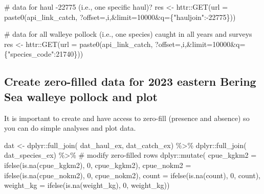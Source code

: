\documentclass[
  letterpaper,
  oneside,
  open=any]{scrbook}
\newenvironment{Shaded}{\begin{snugshade}}{\end{snugshade}}
\newcommand{\AttributeTok}[1]{\textcolor[rgb]{0.40,0.45,0.13}{#1}}
\newcommand{\CommentTok}[1]{\textcolor[rgb]{0.37,0.37,0.37}{#1}}
\newcommand{\DecValTok}[1]{\textcolor[rgb]{0.68,0.00,0.00}{#1}}
\newcommand{\FunctionTok}[1]{\textcolor[rgb]{0.28,0.35,0.67}{#1}}
\newcommand{\NormalTok}[1]{\textcolor[rgb]{0.00,0.23,0.31}{#1}}
\newcommand{\OtherTok}[1]{\textcolor[rgb]{0.00,0.23,0.31}{#1}}
\newcommand{\SpecialCharTok}[1]{\textcolor[rgb]{0.37,0.37,0.37}{#1}}
\newcommand{\StringTok}[1]{\textcolor[rgb]{0.13,0.47,0.30}{#1}}
\begin{document}
\begin{Shaded}
\begin{Highlighting}[]
\CommentTok{\# data for haul {-}22775 (i.e., one specific haul)?}
\NormalTok{res }\OtherTok{\textless{}{-}}\NormalTok{ httr}\SpecialCharTok{::}\FunctionTok{GET}\NormalTok{(}\AttributeTok{url =} \FunctionTok{paste0}\NormalTok{(api\_link\_catch, }
                              \StringTok{\textquotesingle{}?offset=\textquotesingle{}}\NormalTok{,i,}\StringTok{\textquotesingle{}\&limit=10000\&q=\{"hauljoin":{-}22775\}\textquotesingle{}}\NormalTok{))}

\CommentTok{\# data for all walleye pollock (i.e., one species) caught in all years and surveys}
\NormalTok{res }\OtherTok{\textless{}{-}}\NormalTok{ httr}\SpecialCharTok{::}\FunctionTok{GET}\NormalTok{(}\AttributeTok{url =} \FunctionTok{paste0}\NormalTok{(api\_link\_catch, }
                              \StringTok{\textquotesingle{}?offset=\textquotesingle{}}\NormalTok{,i,}\StringTok{\textquotesingle{}\&limit=10000\&q=\{"species\_code":21740\}\textquotesingle{}}\NormalTok{))}
\end{Highlighting}
\end{Shaded}

\subsection{Create zero-filled data for 2023 eastern Bering Sea walleye
pollock and
plot}\label{create-zero-filled-data-for-2023-eastern-bering-sea-walleye-pollock-and-plot}

It is important to create and have access to zero-fill (presence and
absence) so you can do simple analyses and plot data.

\begin{Shaded}
\begin{Highlighting}[]
\NormalTok{dat }\OtherTok{\textless{}{-}}\NormalTok{ dplyr}\SpecialCharTok{::}\FunctionTok{full\_join}\NormalTok{(}
\NormalTok{  dat\_haul\_ex,}
\NormalTok{  dat\_catch\_ex) }\SpecialCharTok{\%\textgreater{}\%} 
\NormalTok{  dplyr}\SpecialCharTok{::}\FunctionTok{full\_join}\NormalTok{(}
\NormalTok{    dat\_species\_ex)  }\SpecialCharTok{\%\textgreater{}\%} 
  \CommentTok{\# modify zero{-}filled rows}
\NormalTok{  dplyr}\SpecialCharTok{::}\FunctionTok{mutate}\NormalTok{(}
    \AttributeTok{cpue\_kgkm2 =} \FunctionTok{ifelse}\NormalTok{(}\FunctionTok{is.na}\NormalTok{(cpue\_kgkm2), }\DecValTok{0}\NormalTok{, cpue\_kgkm2),}
    \AttributeTok{cpue\_nokm2 =} \FunctionTok{ifelse}\NormalTok{(}\FunctionTok{is.na}\NormalTok{(cpue\_nokm2), }\DecValTok{0}\NormalTok{, cpue\_nokm2),}
    \AttributeTok{count =} \FunctionTok{ifelse}\NormalTok{(}\FunctionTok{is.na}\NormalTok{(count), }\DecValTok{0}\NormalTok{, count),}
    \AttributeTok{weight\_kg =} \FunctionTok{ifelse}\NormalTok{(}\FunctionTok{is.na}\NormalTok{(weight\_kg), }\DecValTok{0}\NormalTok{, weight\_kg))}
\end{Highlighting}
\end{Shaded}
\end{document}

